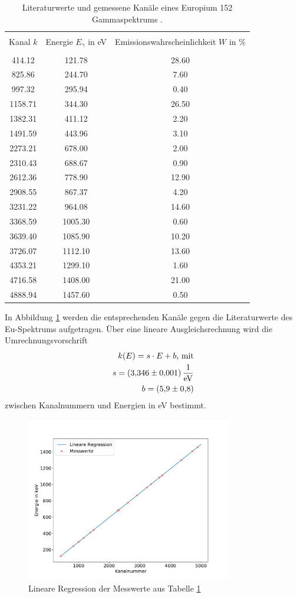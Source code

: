 \begin{table}
\centering
\caption{Literaturwerte und gemessene Kanäle eines Europium 152 Gammaspektrums \cite{sample}.}
\begin{tabular}{c c c}
\hline \\
Kanal $k$ &Energie $E_\gamma$ in eV & Emissionswahrscheinlichkeit $W$ in \% \\
\hline \\
414.12 & 121.78 & 28.60 \\ 825.86 & 244.70 & 7.60 \\ 997.32 & 295.94 & 0.40 \\ 1158.71 & 344.30 & 26.50 \\ 1382.31 & 411.12 & 2.20 \\ 1491.59 & 443.96 & 3.10 \\ 2273.21 & 678.00 & 2.00 \\ 2310.43 & 688.67 & 0.90 \\ 2612.36 & 778.90 & 12.90 \\ 2908.55 & 867.37 & 4.20 \\ 3231.22 & 964.08 & 14.60 \\ 3368.59 & 1005.30 & 0.60 \\ 3639.40 & 1085.90 & 10.20 \\ 3726.07 & 1112.10 & 13.60 \\ 4353.21 & 1299.10 & 1.60 \\ 4716.58 & 1408.00 & 21.00 \\ 4888.94 & 1457.60 & 0.50 \\ 
\hline
\end{tabular}
\label{tab:atab1}
\end{table}
In Abbildung \ref{fig:Kalibrierung} werden die entsprechenden Kanäle gegen die Literaturwerte des Eu-Spektrums aufgetragen. 
Über eine lineare Ausgleichsrechnung wird die Umrechnungsvorschrift
\begin{align*}
k(E) = s \cdot E + b \text{, mit}\\
  s = \SI{3.346+-0.001}{\per\electronvolt}\\
  b = \SI{ 5.9+-0.8}{}
\end{align*}
zwischen Kanalnummern und Energien in eV bestimmt.
\begin{figure}
\centering
\includegraphics[width=0.8\textwidth]{python/plots/kalibrierung.pdf}
\caption{Lineare Regression der Messwerte aus Tabelle \ref{tab:atab1}}
\label{fig:Kalibrierung}
\end{figure}
